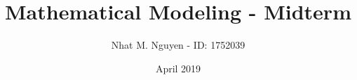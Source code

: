\documentclass[9pt, landscape, a4paper]{article}
\title{\vspace{-4ex}\Large{Mathematical Modeling - Midterm}}
\author{Nhat M. Nguyen - ID: 1752039}
\date{April 2019}
\begin{document}
  \maketitle

  \begin{multicols}{2}
    \tableofcontents
  \end{multicols}

  \clearpage

  
  
\end{document}

